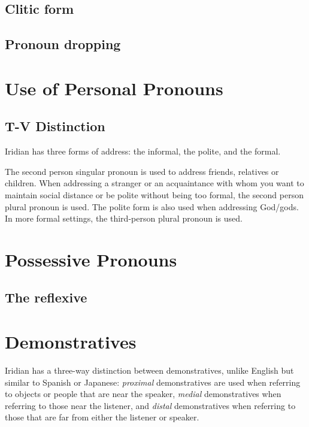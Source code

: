 \subsection{Clitic form}

\subsection{Pronoun dropping}

\section{Use of Personal Pronouns}

\subsection{T-V Distinction}

Iridian has three forms of address: the informal, the polite, and the formal.

The second person singular pronoun  is used to address friends, relatives or children. When addressing a stranger or an acquaintance with whom you want to maintain social distance or be polite without being too formal, the second person plural pronoun  is used. The polite form is also used when addressing God/gods. In more formal settings, the third-person plural pronoun  is used.



\section{Possessive Pronouns}

\subsection{The reflexive }

\section{Demonstratives}

Iridian has a three-way distinction between demonstratives, unlike English but similar to Spanish or Japanese: \emph{proximal} demonstratives are used when referring to objects or people that are near the speaker, \emph{medial} demonstratives when referring to those near the listener, and \emph{distal} demonstratives when referring to those that are far from either the listener or speaker.

